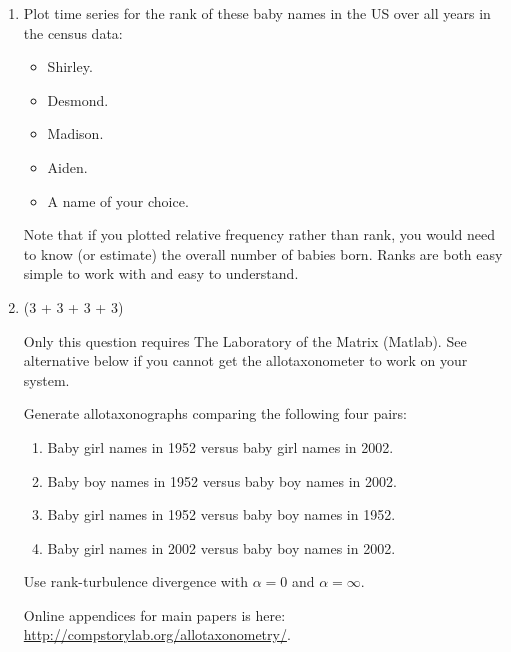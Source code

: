 \begin{enumerate}

\item

  Plot time series for the rank
  of these baby names in the US over all years in the census data:

  \begin{itemize}
  \item 
    Shirley.
  \item
    Desmond.
  \item
    Madison.
  \item
    Aiden.
  \item
    A name of your choice.
  \end{itemize}

  Note that if you plotted relative frequency rather than rank,
  you would need to know (or estimate) the overall number of babies born.
  Ranks are both easy simple to work with and easy to understand.


  
   \solutionstart


   \solutionend

\item (3 + 3 + 3 + 3)

  Only this question requires The Laboratory of the Matrix (Matlab).
  See alternative below if you cannot get the allotaxonometer to work on your system.

  Generate allotaxonographs comparing the following four pairs:

  \begin{enumerate}
  \item
    Baby girl names in 1952 versus baby girl names in 2002.
  \item
    Baby boy names in 1952 versus baby boy names in 2002.
  \item
    Baby girl names in 1952 versus baby boy names in 1952.
  \item
    Baby girl names in 2002 versus baby boy names in 2002.
  \end{enumerate}

  Use rank-turbulence divergence with $\alpha = 0$ and $\alpha = \infty$.

  Online appendices for main papers is
  here:
  \href{http://compstorylab.org/allotaxonometry/}{http://compstorylab.org/allotaxonometry/}.


\end{enumerate}
